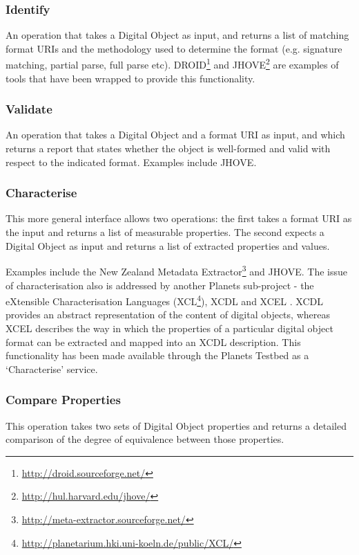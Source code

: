 \documentclass{article}
\begin{document}
\subsubsection{Identify}
An operation that takes a Digital Object as input, and returns a list of matching
format URIs and the methodology used to determine the format (e.g. signature
matching, partial parse, full parse etc).
DROID\footnote{\url{http://droid.sourceforge.net/}} and
JHOVE\footnote{\url{http://hul.harvard.edu/jhove/}} are examples of tools that
have been wrapped to provide this functionality.

\subsubsection{Validate} 
An operation that takes a Digital Object and a format URI as input, and which
returns a report that states whether the object is well-formed and valid with
respect to the indicated format. Examples include JHOVE.

\subsubsection{Characterise}
\label{xcl}
This more general interface allows two operations: the first takes a format URI
as the input and returns a list of measurable properties. The second expects a
Digital Object as input and returns a list of extracted properties and values.

Examples include the New Zealand Metadata
Extractor\footnote{\url{http://meta-extractor.sourceforge.net/}} and JHOVE. The
issue of characterisation also is addressed by another Planets sub-project - the
eXtensible Characterisation Languages
(XCL\footnote{\url{http://planetarium.hki.uni-koeln.de/public/XCL/}}), XCDL and
XCEL \cite{xcl2008,becker-xcdl}. XCDL provides an abstract representation of the
content of digital objects, whereas XCEL describes the way in which the
properties of a particular digital object format can be extracted and mapped into
an XCDL description. This functionality has been made available through the
Planets Testbed as a `Characterise' service.

\subsubsection{Compare Properties}
This operation takes two sets of Digital Object properties and returns a detailed
comparison of the degree of equivalence between those properties.
\end{document}
